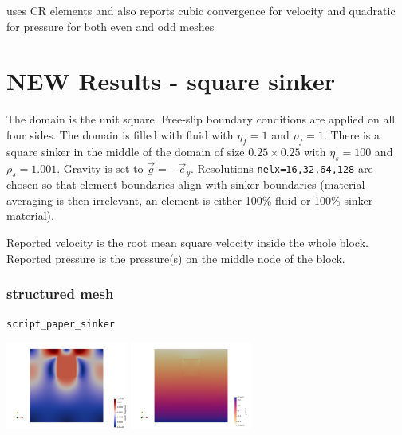 \textcite{demh19} uses CR elements and also reports cubic convergence for velocity and quadratic for pressure
for both even and odd meshes


\newpage
\section*{NEW Results - square sinker}

The domain is the unit square. Free-slip boundary conditions are applied on all 
four sides. The domain is filled with fluid with $\eta_f=1$ and $\rho_f=1$.
There is a square sinker in the middle of the domain of size $0.25\times 0.25$ with $\eta_s=100$ and
$\rho_s=1.001$. Gravity is set to $\vec{g}=-\vec{e}_y$. 
Resolutions \lstinline{nelx=16,32,64,128} are chosen so that element boundaries align with sinker boundaries 
(material averaging is then irrelevant, an element is either 100\% fluid or 100\% sinker material). 


Reported velocity is the root mean square velocity inside the whole block.
Reported pressure is the pressure(s) on the middle node of the block.

\subsubsection*{structured mesh}

{\tt script\_paper\_sinker}

\begin{center}
\includegraphics[width=4cm]{python_codes/fieldstone_120/paperresults/sinker/structured/vel.png}
\includegraphics[width=4cm]{python_codes/fieldstone_120/paperresults/sinker/structured/press.png}
\end{center}

